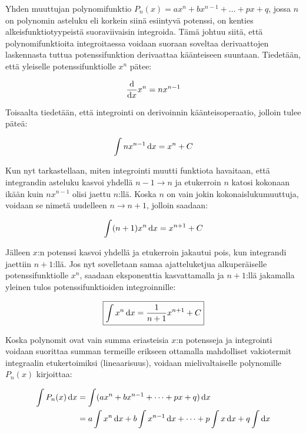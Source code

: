 \documentclass[../integrointiopas.tex]{subfiles}
\begin{document}
	Yhden muuttujan polynomifunktio $P_n(x) = ax^n + bx^{n - 1} + \dots + px + q$, jossa $n$ on polynomin asteluku eli korkein siinä esiintyvä potenssi, on kenties alkeisfunktiotyypeistä suoraviivaisin integroida. Tämä johtuu siitä, että polynomifunktioita integroitaessa voidaan suoraan soveltaa derivaattojen laskennasta tuttua potenssifunktion derivaattaa käänteiseen suuntaan. Tiedetään, että yleiselle potenssifunktiolle $x^n$ pätee:
	
	\begin{equation}
		\odv{}{x}x^n = nx^{n - 1}
	\end{equation}
	
	Toisaalta tiedetään, että integrointi on derivoinnin käänteisoperaatio, jolloin tulee päteä:
	
	\begin{equation}
		\int nx^{n - 1}\odif{x} = x^n + C
	\end{equation}
	
	Kun nyt tarkastellaan, miten integrointi muutti funktiota havaitaan, että integrandin asteluku kasvoi yhdellä $n - 1 \to n$ ja etukerroin $n$ katosi kokonaan ikään kuin $nx^{n - 1}$ olisi jaettu $n$:llä. Koska $n$ on vain jokin kokonaislukumuuttuja, voidaan se nimetä uudelleen $n \to n + 1$, jolloin saadaan:
	
	\begin{equation}
		\int (n + 1)x^{n}\odif{x} = x^{n + 1} + C
	\end{equation}
	
	Jälleen $x$:n potenssi kasvoi yhdellä ja etukerroin jakautui pois, kun integrandi jaettiin $n + 1$:llä. Jos nyt sovelletaan samaa ajatteluketjua alkuperäiselle potenssifunktiolle $x^n$, saadaan eksponenttia kasvattamalla ja $n + 1$:llä jakamalla yleinen tulos potenssifunktioiden integroinnille:
	
	\begin{equation}
		\boxed{\int x^n\odif{x} = \frac{1}{n + 1}x^{n + 1} + C} 
	\end{equation}
	
	Koska polynomit ovat vain summa eriasteisia $x$:n potensseja ja integrointi voidaan suorittaa summan termeille erikseen ottamalla mahdolliset vakiotermit integraalin etukertoimiksi (lineaarisuus), voidaan mielivaltaiselle polynomille $P_n(x)$ kirjoittaa:
	
	\begin{align}
		\int P_n(x)\odif{x} &= \int (ax^n + bx^{n - 1} + \dots + px + q)\odif{x} \\
		&= a\int x^n\odif{x} + b\int x^{n - 1}\odif{x} + \dots + p\int x\odif{x} + q\int\odif{x}
	\end{align}
	
\end{document}
